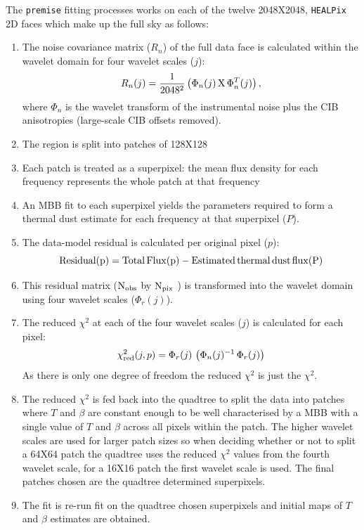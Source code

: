 \documentclass[a4paper,fleqn,usenatbib]{mnras}
\begin{document}
The {\texttt{premise}} fitting processes works on each of the twelve 2048X2048, {\texttt{HEALPix}} 2D faces which make up the full sky as follows:
\begin{enumerate}[label*=\arabic*.]
\item The noise covariance matrix ($R_{n}$) of the full data face is calculated within the wavelet domain for four wavelet scales ($j$):
\begin{equation}
R_{n}(j) = \frac{1}{2048^2} \left( \Phi_{n}(j) \, {\rm{X}}  \, \Phi_{n}^{T}(j) \right),
\end{equation} 
where $\Phi_{n}$ is the wavelet transform of the instrumental noise plus the CIB anisotropies (large-scale CIB offsets removed). 
\item The region is split into patches of 128X128
\item Each patch is treated as a superpixel: the mean flux density for each frequency represents the whole patch at that frequency	
\item An MBB fit to each superpixel yields the parameters required to form a thermal dust estimate for each frequency at that superpixel ($P$).
\item The data-model residual is calculated per original pixel ($p$):
\begin{equation}
\rm{Residual}($p$) = \rm{Total \, Flux}(p) -  \rm{Estimated \, thermal \, dust \, flux}(P)
\end{equation}
\item This residual matrix (${\rm{N_{obs}}}$ by ${\rm{N_{pix}}}$ ) is transformed into the wavelet domain using four wavelet scales ($\Phi_{r}(j)$). 
\item The reduced $\chi^{2}$ at each of the four wavelet scales ($j$) is calculated for each pixel:
\begin{equation}
\chi^{2}_{\rm{red}}(j, p) = \Phi_{r}(j) \, \left( \Phi_{n}(j)^{-1} \, \Phi_{r}(j) \right)
\end{equation}
As there is only one degree of freedom the reduced $\chi^{2}$ is just the $\chi^{2}$.
\item The reduced $\chi^{2}$ is fed back into the quadtree to split the data into patches where $T$ and $\beta$ are constant enough to be well characterised by a MBB with a single value of $T$ and $\beta$ across all pixels within the patch. The higher wavelet scales are used for larger patch sizes so when deciding whether or not to split a 64X64 patch the quadtree uses the reduced $\chi^{2}$ values from the fourth wavelet scale, for a 16X16 patch the first wavelet scale is used. The final patches chosen are the quadtree determined superpixels.  
\item The fit is re-run fit on the quadtree chosen superpixels and initial maps of $T$ and $\beta$ estimates are obtained.
\end{enumerate}
\end{document}
